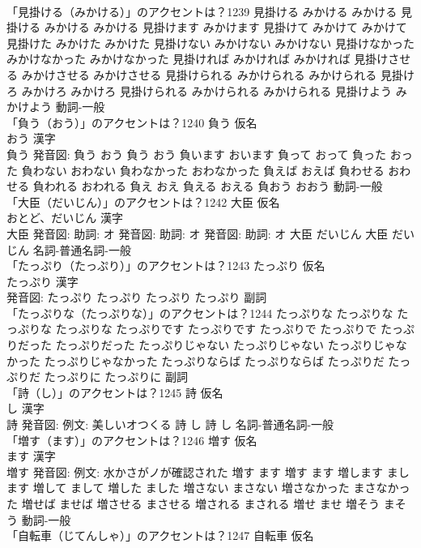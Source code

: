\documentclass[8pt]{extreport}
\begin{document}
\begin{CJK}{UTF8}{min}
\\	「見掛ける（みかける）」のアクセントは？1239		見掛ける みかける みかける		見掛ける みかける みかける 見掛けます みかけます 見掛けて みかけて みかけて 見掛けた みかけた みかけた 見掛けない みかけない みかけない 見掛けなかった みかけなかった みかけなかった 見掛ければ みかければ みかければ 見掛けさせる みかけさせる みかけさせる 見掛けられる みかけられる みかけられる 見掛けろ みかけろ みかけろ 見掛けられる みかけられる みかけられる 見掛けよう みかけよう				動詞-一般 
\\	「負う（おう）」のアクセントは？1240	負う 仮名　
\\	おう 漢字　
\\	負う 発音図:	負う おう		負う おう 負います おいます 負って おって 負った おった 負わない おわない 負わなかった おわなかった 負えば おえば 負わせる おわせる 負われる おわれる 負え おえ 負える おえる 負おう おおう				動詞-一般 
\\	「大臣（だいじん）」のアクセントは？1242	大臣 仮名　
\\	おとど、だいじん 漢字　
\\	大臣 発音図: 助詞: オ 発音図: 助詞: オ 発音図: 助詞: オ	大臣 だいじん		大臣 だいじん				名詞-普通名詞-一般 
\\	「たっぷり（たっぷり）」のアクセントは？1243	たっぷり 仮名　
\\	たっぷり 漢字　
\\	発音図:	たっぷり たっぷり		たっぷり たっぷり				副詞 
\\	「たっぷりな（たっぷりな）」のアクセントは？1244		たっぷりな たっぷりな		たっぷりな たっぷりな たっぷりです たっぷりです たっぷりで たっぷりで たっぷりだった たっぷりだった たっぷりじゃない たっぷりじゃない たっぷりじゃなかった たっぷりじゃなかった たっぷりならば たっぷりならば たっぷりだ たっぷりだ たっぷりに たっぷりに				副詞 
\\	「詩（し）」のアクセントは？1245	詩 仮名　
\\	し 漢字　
\\	詩 発音図: 例文: 美しいオつくる	詩 し		詩 し				名詞-普通名詞-一般 
\\	「増す（ます）」のアクセントは？1246	増す 仮名　
\\	ます 漢字　
\\	増す 発音図: 例文: 水かさがノが確認された	増す ます		増す ます 増します まします 増して まして 増した ました 増さない まさない 増さなかった まさなかった 増せば ませば 増させる まさせる 増される まされる 増せ ませ 増そう まそう				動詞-一般 
\\	「自転車（じてんしゃ）」のアクセントは？1247	自転車 仮名　

\end{CJK}
\end{document}
